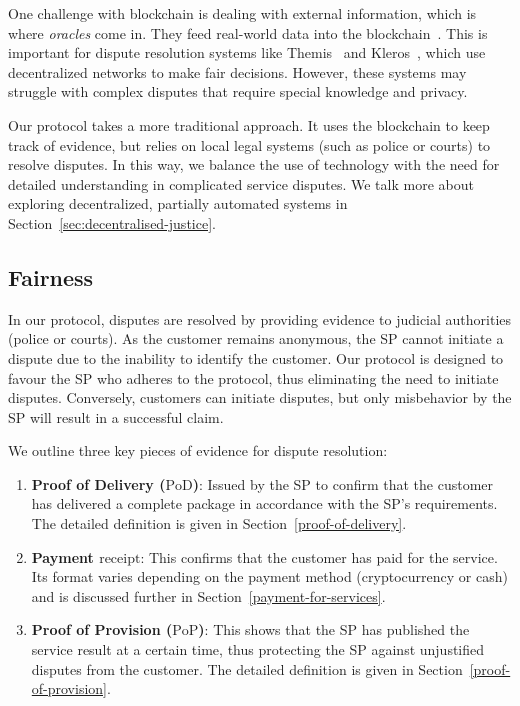 \documentclass[pdftex,twocolumn,epjc3]{svjour3}
\begin{document}
\begin{sloppypar}
One challenge with blockchain is dealing with external information, which is where \textit{oracles} come in. They feed real-world data into the blockchain~\cite{breidenbachChainlinkNextSteps2021}. This is important for dispute resolution systems like Themis~\cite{mengThemisDecentralizedEscrow2019} and Kleros~\cite{bergollaKlerosSociolegalCase2022}, which use decentralized networks to make fair decisions. However, these systems may struggle with complex disputes that require special knowledge and privacy.
\end{sloppypar}

Our protocol takes a more traditional approach. It uses the blockchain to keep track of evidence, but relies on local legal systems (such as police or courts) to resolve disputes. In this way, we balance the use of technology with the need for detailed understanding in complicated service disputes. We talk more about exploring decentralized, partially automated systems in Section~\ref{sec:decentralised-justice}.

\subsection{Fairness}\label{fairness}
In our protocol, disputes are resolved by providing evidence to judicial authorities (police or courts). As the customer remains anonymous, the SP cannot initiate a dispute due to the inability to identify the customer. Our protocol is designed to favour the SP who adheres to the protocol, thus eliminating the need to initiate disputes. Conversely, customers can initiate disputes, but only misbehavior by the SP will result in a successful claim.

We outline three key pieces of evidence for dispute resolution:

\begin{enumerate}
  \item \textbf{Proof of Delivery ($\textrm{PoD}$)}: Issued by the SP to confirm that the customer has delivered a complete package in accordance with the SP's requirements. The detailed definition is given in Section~\ref{proof-of-delivery}.
  
  \item \textbf{Payment $\textrm{receipt}$}: This confirms that the customer has paid for the service. Its format varies depending on the payment method (cryptocurrency or cash) and is discussed further in Section~\ref{payment-for-services}.
  
  \item \textbf{Proof of Provision ($\textrm{PoP}$)}: This shows that the SP has published the service result at a certain time, thus protecting the SP against unjustified disputes from the customer. The detailed definition is given in Section~\ref{proof-of-provision}.
\end{enumerate}
\end{document}
